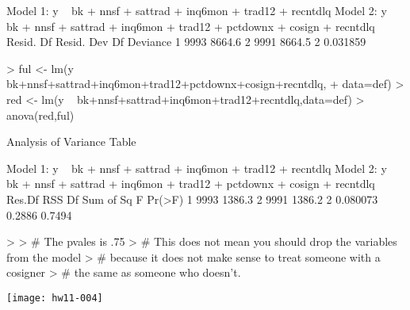 \documentclass{article}
\begin{document}
\begin{center}
\begin{Schunk}
\begin{Soutput}
Model 1: y ~ bk + nnsf + sattrad + inq6mon + trad12 + recntdlq
Model 2: y ~ bk + nnsf + sattrad + inq6mon + trad12 + pctdownx + cosign + 
    recntdlq
  Resid. Df Resid. Dev Df Deviance
1      9993     8664.6            
2      9991     8664.5  2 0.031859
\end{Soutput}
\begin{Sinput}
> ful <- lm(y ~ bk+nnsf+sattrad+inq6mon+trad12+pctdownx+cosign+recntdlq,
+                data=def)
> red <- lm(y ~ bk+nnsf+sattrad+inq6mon+trad12+recntdlq,data=def)
> anova(red,ful)
\end{Sinput}
\begin{Soutput}
Analysis of Variance Table

Model 1: y ~ bk + nnsf + sattrad + inq6mon + trad12 + recntdlq
Model 2: y ~ bk + nnsf + sattrad + inq6mon + trad12 + pctdownx + cosign + 
    recntdlq
  Res.Df    RSS Df Sum of Sq      F Pr(>F)
1   9993 1386.3                           
2   9991 1386.2  2  0.080073 0.2886 0.7494
\end{Soutput}
\begin{Sinput}
> 
> # The pvales is .75
> # This does not mean you should drop the variables from the model
> # because it does not make sense to treat someone with a cosigner
> # the same as someone who doesn't.
\end{Sinput}
\end{Schunk}
\texttt{[image: hw11-004]}
\end{center}
\end{document}
